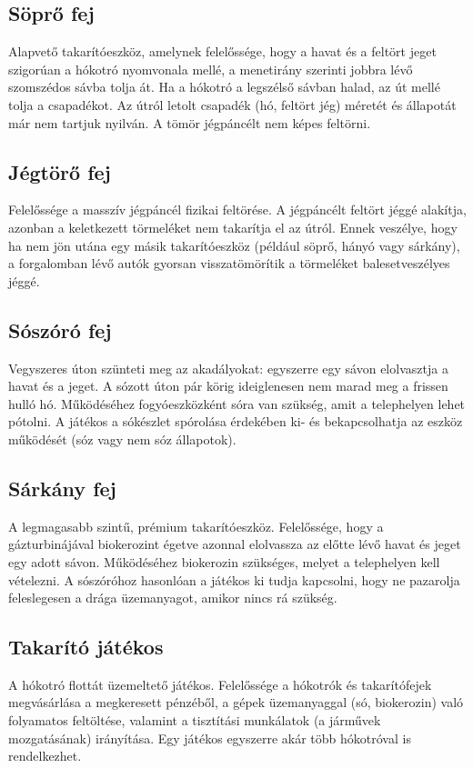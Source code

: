 \subsection{Söprő fej}
\par{Alapvető takarítóeszköz, amelynek felelőssége, hogy a havat és a feltört jeget szigorúan a hókotró nyomvonala mellé, a menetirány szerinti jobbra lévő szomszédos sávba tolja át. Ha a hókotró a legszélső sávban halad, az út mellé tolja a csapadékot. Az útról letolt csapadék (hó, feltört jég) méretét és állapotát már nem tartjuk nyilván. A tömör jégpáncélt nem képes feltörni.}

\subsection{Jégtörő fej}
\par{Felelőssége a masszív jégpáncél fizikai feltörése. A jégpáncélt feltört jéggé alakítja, azonban a keletkezett törmeléket nem takarítja el az útról. Ennek veszélye, hogy ha nem jön utána egy másik takarítóeszköz (például söprő, hányó vagy sárkány), a forgalomban lévő autók gyorsan visszatömörítik a törmeléket balesetveszélyes jéggé.}

\subsection{Sószóró fej}
\par{Vegyszeres úton szünteti meg az akadályokat: egyszerre egy sávon elolvasztja a havat és a jeget. A sózott úton pár körig ideiglenesen nem marad meg a frissen hulló hó. Működéséhez fogyóeszközként sóra van szükség, amit a telephelyen lehet pótolni. A játékos a sókészlet spórolása érdekében ki- és bekapcsolhatja az eszköz működését (sóz vagy nem sóz állapotok).}

\subsection{Sárkány fej}
\par{A legmagasabb szintű, prémium takarítóeszköz. Felelőssége, hogy a gázturbinájával biokerozint égetve azonnal elolvassza az előtte lévő havat és jeget egy adott sávon. Működéséhez biokerozin szükséges, melyet a telephelyen kell vételezni. A sószóróhoz hasonlóan a játékos ki tudja kapcsolni, hogy ne pazarolja feleslegesen a drága üzemanyagot, amikor nincs rá szükség.}

\subsection{Takarító játékos}
\par{A hókotró flottát üzemeltető játékos. Felelőssége a hókotrók és takarítófejek megvásárlása a megkeresett pénzéből, a gépek üzemanyaggal (só, biokerozin) való folyamatos feltöltése, valamint a tisztítási munkálatok (a járművek mozgatásának) irányítása. Egy játékos egyszerre akár több hókotróval is rendelkezhet.}

